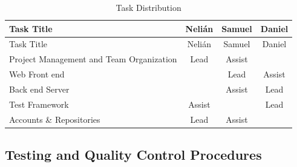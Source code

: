 \begin{center}
\setlength{\extrarowheight}{1.5pt}
  \begin{longtable}{|m{3.25in}|c|c|c|}
 \caption{Task Distribution \label{tasks}} \\
   \hline
  
  \centering Task Title & Nelián & Samuel & Daniel \\
  \hline \hline \endfirsthead
  
     \hline

	\centering Task Title & Nelián & Samuel & Daniel \\  
	\hline \hline \endhead
  
  \endfoot  
  
  Project Management and Team Organization & Lead & Assist & \\ \hline
  Web Front end & & Lead & Assist \\ \hline
  Back end Server & & Assist & Lead \\ \hline
  Test Framework & Assist & & Lead \\ \hline
  Accounts \& Repositories & Lead & Assist & \\ \hline
   \end{longtable}
\end{center}

\subsection{Testing and Quality Control Procedures}
